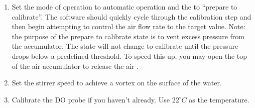 \documentclass[letterpaper,10pt,english]{sphinxmanual}
\begin{document}
\begin{enumerate}
\item {} 
Set the mode of operation  to automatic operation and the  to “prepare to calibrate”. The software should quickly cycle through the calibration step and then begin attempting to control the air flow rate to the target value.  Note:  the purpose of the prepare to calibrate state is to vent excess pressure from the accumulator.  The state will not change to calibrate until the pressure drops below a predefined threshold.  To speed this up, you may open the top of the air accumulator to release the air .

\item {} 
Set the stirrer speed to achieve a vortex on the surface of the water.

\item {} 
Calibrate the DO probe if you haven’t already. Use \(22^{\circ}C\) as the temperature.

\end{enumerate}
\end{document}
